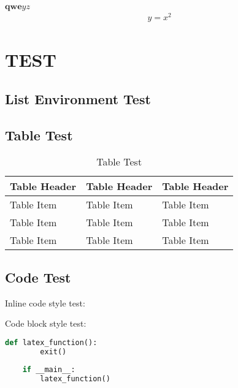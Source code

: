 \documentclass[article-en]{mdocs}
\begin{document}
$\bm{qwe}yz$
\begin{align}
    y=x^2
\end{align}

\lipsum[1-8]
\section{TEST}
\lipsum[1-8]
\subsection{List Environment Test}
\lipsum[1]
\begin{itemlist}
    \item \lipsum[1]
    \item \lipsum[1]
    \item \lipsum[1]
\end{itemlist}

\lipsum[1]
\begin{numlist}
    \item \lipsum[1]
    \item \lipsum[1]
    \item \lipsum[1]
\end{numlist}
\subsection{Table Test}
\begin{table}[H]
    \centering
    \begin{tabular}{lll}
        \toprule
        Table Header & Table Header & Table Header\\
        \midrule
        Table Item & Table Item & Table Item\\
        Table Item & Table Item & Table Item\\
        Table Item & Table Item & Table Item\\
        \bottomrule
    \end{tabular}
    \caption{Table Test}
\end{table}
\subsection{Code Test}
Inline code style test:


Code block style test:
\begin{lstlisting}[language=Python]
    def latex_function():
        exit()
    
    if __main__:
        latex_function()
\end{lstlisting}
\end{document}
